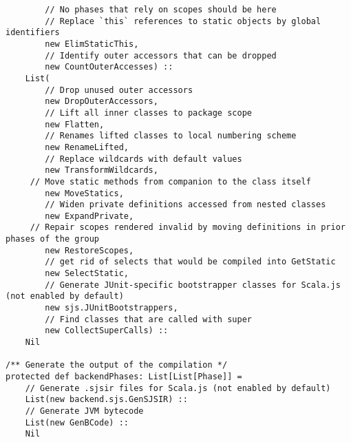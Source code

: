 \documentclass[letterpaper,12pt,titlepage,oneside,final]{book}
\begin{document}
\begin{verbatim}
		// No phases that rely on scopes should be here
		// Replace `this` references to static objects by global identifiers
		new ElimStaticThis,         
		// Identify outer accessors that can be dropped
		new CountOuterAccesses) :: 
	List(
		// Drop unused outer accessors
		new DropOuterAccessors,     
		// Lift all inner classes to package scope
		new Flatten,                
		// Renames lifted classes to local numbering scheme
		new RenameLifted,           
		// Replace wildcards with default values
		new TransformWildcards,     
	 // Move static methods from companion to the class itself
		new MoveStatics,           
		// Widen private definitions accessed from nested classes
		new ExpandPrivate,          
	 // Repair scopes rendered invalid by moving definitions in prior phases of the group
		new RestoreScopes,         
		// get rid of selects that would be compiled into GetStatic
		new SelectStatic,           
		// Generate JUnit-specific bootstrapper classes for Scala.js (not enabled by default)
		new sjs.JUnitBootstrappers, 
		// Find classes that are called with super
		new CollectSuperCalls) ::   
	Nil
	
/** Generate the output of the compilation */
protected def backendPhases: List[List[Phase]] =
	// Generate .sjsir files for Scala.js (not enabled by default)
	List(new backend.sjs.GenSJSIR) :: 
	// Generate JVM bytecode
	List(new GenBCode) ::             
	Nil
\end{verbatim}
\end{document}
